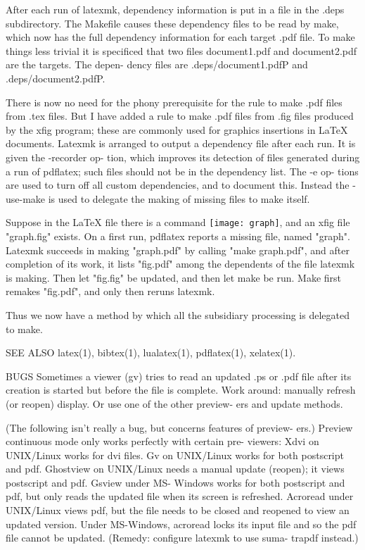        After  each  run of latexmk, dependency information is put in a file in
       the .deps subdirectory.  The Makefile causes these dependency files  to
       be read by make, which now has the full dependency information for each
       target .pdf file.  To make things less trivial it  is  specificed  that
       two  files document1.pdf and document2.pdf are the targets.  The depen-
       dency files are .deps/document1.pdfP and .deps/document2.pdfP.

       There is now no need for the phony prerequisite for the  rule  to  make
       .pdf files from .tex files.  But I have added a rule to make .pdf files
       from .fig files produced by the xfig program; these are  commonly  used
       for  graphics  insertions  in  LaTeX documents.  Latexmk is arranged to
       output a dependency file after each run.  It is given the -recorder op-
       tion,  which  improves its detection of files generated during a run of
       pdflatex; such files should not be in the dependency list.  The -e  op-
       tions  are  used  to  turn off all custom dependencies, and to document
       this.  Instead the -use-make is used to delegate the making of  missing
       files to make itself.

       Suppose  in  the LaTeX file there is a command \texttt{[image: graph]},
       and an xfig file "graph.fig" exists.  On a first run, pdflatex  reports
       a  missing  file, named "graph". Latexmk succeeds in making "graph.pdf"
       by calling "make graph.pdf", and after completion of its work, it lists
       "fig.pdf" among the dependents of the file latexmk is making.  Then let
       "fig.fig" be updated, and then let make be  run.   Make  first  remakes
       "fig.pdf", and only then reruns latexmk.

       Thus  we  now  have  a method by which all the subsidiary processing is
       delegated to make.


SEE ALSO
       latex(1), bibtex(1), lualatex(1), pdflatex(1), xelatex(1).

BUGS
       Sometimes a viewer (gv) tries to read an updated .ps or .pdf file after
       its  creation is started but before the file is complete.  Work around:
       manually refresh (or reopen) display.  Or use one of the other preview-
       ers and update methods.

       (The  following  isn't  really a bug, but concerns features of preview-
       ers.)  Preview continuous mode only works perfectly with  certain  pre-
       viewers:  Xdvi  on  UNIX/Linux  works  for dvi files.  Gv on UNIX/Linux
       works for both postscript and pdf.  Ghostview  on  UNIX/Linux  needs  a
       manual  update (reopen); it views postscript and pdf.  Gsview under MS-
       Windows works for both postscript and pdf, but only reads  the  updated
       file  when  its  screen  is refreshed.  Acroread under UNIX/Linux views
       pdf, but the file needs to be closed and reopened to  view  an  updated
       version.   Under  MS-Windows,  acroread locks its input file and so the
       pdf file cannot be updated.  (Remedy: configure latexmk  to  use  suma-
       trapdf instead.)



